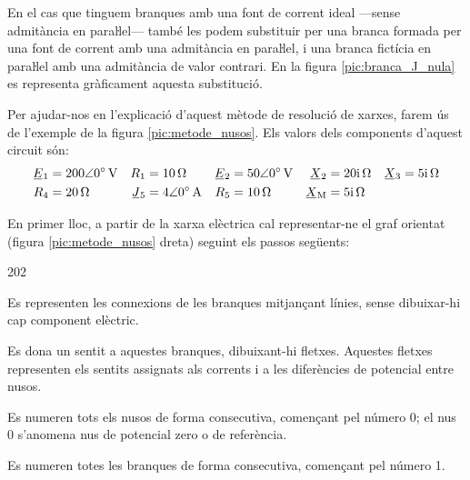 En el cas que tinguem branques amb una font de corrent ideal ---sense admitància en paraŀlel---  també les podem substituir per una branca  formada per una font de corrent amb una admitància en paraŀlel, i una branca fictícia en paraŀlel amb una admitància de valor contrari. En la figura \vref{pic:branca_J_nula} es representa gràficament aquesta substitució.
\begin{center}
	
	\label{pic:branca_J_nula}
\end{center}

Per ajudar-nos en l'explicació d'aquest mètode de resolució de xarxes, farem
ús de l'exemple de la figura \vref{pic:metode_nusos}. Els valors dels components d'aquest
circuit són:
\begin{align*}
   \cmplx{E}_1 &= \complexqty{200:0}{V} & R_1 &= \qty{10}{\ohm} &
   \cmplx{E}_2 &= \complexqty{50:0}{V}  & \cmplx{X}_2 &= \complexqty{j20}{\ohm} &
   \cmplx{X}_3 &= \complexqty{j5}{\ohm} \\
   R_4 &= \qty{20}{\ohm} & \cmplx{J}_5 &= \complexqty{4:0}{A} &
   R_5 &= \qty{10}{\ohm} & \cmplx{X}\ped{M} &= \complexqty{j5}{\ohm}
\end{align*}

\begin{center}
\vspace{-4mm}
    
    \label{pic:metode_nusos}
\end{center}

En primer lloc, a partir de la xarxa elèctrica
cal representar-ne el graf orientat (figura \vref{pic:metode_nusos} dreta) seguint els passos següents:
\begin{dingautolist}{202}
   \item Es representen les connexions de les branques mitjançant línies, sense dibuixar-hi cap component elèctric.
   \item Es dona un sentit a aquestes branques, dibuixant-hi fletxes. Aquestes fletxes representen els sentits assignats als corrents i a les diferències de potencial entre nusos.
   \item Es numeren tots els nusos de forma consecutiva, començant pel número 0; el nus 0 s'anomena nus de potencial zero o de referència.
   \item Es numeren totes les branques de forma consecutiva, començant pel número 1.
\end{dingautolist}

